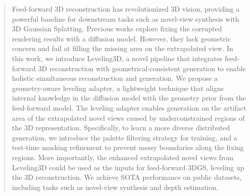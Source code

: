 \begin{abstract}
Feed-forward 3D reconstruction has revolutionized 3D vision, providing a powerful baseline for downstream tasks such as novel-view synthesis with 3D Gaussian Splatting. Previous works explore fixing the corrupted rendering results with a diffusion model. However, they lack geometric concern and fail at filling the missing area on the extrapolated view. In this work, we introduce Leveling3D, a novel pipeline that integrates feed-forward 3D reconstruction with geometrical-consistent generation to enable holistic simultaneous reconstruction and generation. We propose a geometry-aware leveling adapter, a lightweight technique that aligns internal knowledge in the diffusion model with the geometry prior from the feed-forward model. The leveling adapter enables generation on the artifact area of the extrapolated novel views caused by underconstrained regions of the 3D representation. Specifically, to learn a more diverse distributed generation, we introduce the palette filtering strategy for training, and a test-time masking refinement to prevent messy boundaries along the fixing regions. More importantly, the enhanced extrapolated novel views from Leveling3D could be used as the inputs for feed-forward 3DGS, leveling up the 3D reconstruction. We achieve SOTA performance on public datasets, including tasks such as novel-view synthesis and depth estimation.
\end{abstract}